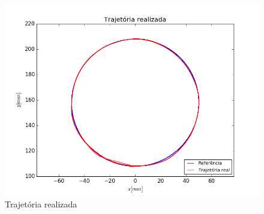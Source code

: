 \documentclass[]{politex}
\begin{document}
\begin{figure}[H]
	\centering
	\includegraphics[scale=0.39]{../../../Experimental/Aquisicoes/PIDx_circulo/xy.png}  
	\caption{Trajetória realizada}
	\label{fig:PIDx_circulo_xy}
\end{figure}
\end{document}
